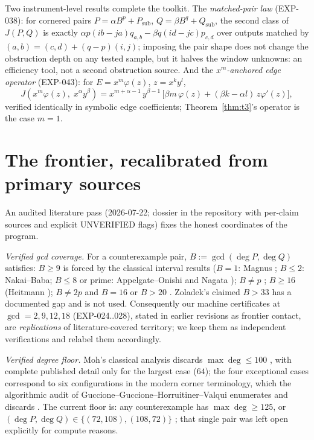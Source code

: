 \documentclass[11pt]{article}
\theoremstyle{remark}
\begin{document}
Two instrument-level results complete the toolkit. The \emph{matched-pair law} (EXP-038):
for cornered pairs $P = \alpha B^p + P_{\mathrm{sub}}$, $Q = \beta B^q + Q_{\mathrm{sub}}$,
the second class of $J(P, Q)$ is exactly
$\alpha p (ib - ja) q_{a,b} - \beta q (id - jc) p_{c,d}$ over outputs matched by
$(a, b) = (c, d) + (q - p)(i, j)$; imposing the pair shape does not change the obstruction
depth on any tested sample, but it halves the window unknowns: an efficiency tool, not a
second obstruction source. And the \emph{$x^m$-anchored edge operator} (EXP-043): for
$E = x^m \varphi(z)$, $z = x^k y^l$,
\[
J\left(x^m \varphi(z),\; x^{\alpha} y^{\beta}\right)
= x^{m + \alpha - 1}\, y^{\beta - 1}\,
\bigl[\beta m\, \varphi(z) + (\beta k - \alpha l)\, z\varphi'(z)\bigr],
\]
verified identically in symbolic edge coefficients; Theorem~\ref{thm:t3}'s operator is the
case $m = 1$.

\section{The frontier, recalibrated from primary sources}\label{sec:frontier}

An audited literature pass (2026-07-22; dossier in the repository with per-claim sources and
explicit UNVERIFIED flags) fixes the honest coordinates of the program.

\emph{Verified gcd coverage.} For a counterexample pair, $B := \gcd(\deg P, \deg Q)$
satisfies: $B \ge 9$ is forced by the classical interval results ($B = 1$: Magnus
\cite{Magnus1955}; $B \le 2$: Nakai--Baba; $B \le 8$ or prime: Appelgate--Onishi
\cite{AppelgateOnishi1985} and Nagata \cite{Nagata1989}); $B \ne p$ \cite{Abhyankar2008};
$B \ge 16$ (Heitmann \cite{Heitmann1990}); $B \ne 2p$ and $B = 16$ or $B > 20$
\cite{GGV2017}. Zoladek's claimed $B > 33$ has a documented gap \cite{GGV2017} and is not
used. Consequently our machine certificates at $\gcd = 2, 9, 12, 18$ (EXP-024..028), stated
in earlier revisions as frontier contact, are \emph{replications} of literature-covered
territory; we keep them as independent verifications and relabel them accordingly.

\emph{Verified degree floor.} Moh's classical analysis discards $\max\deg \le 100$
\cite{Moh1983}, with complete published detail only for the largest case ($64$); the
four exceptional cases correspond to six configurations in the modern corner terminology,
which the algorithmic audit of Guccione--Guccione--Horruitiner--Valqui enumerates and
discards \cite{GGHV2017, GGHV2022}. The current floor is: any counterexample has
$\max\deg \ge 125$, or $(\deg P, \deg Q) \in \{(72, 108), (108, 72)\}$ \cite{GGHV2022};
that single pair was left open explicitly for compute reasons.
\end{document}
